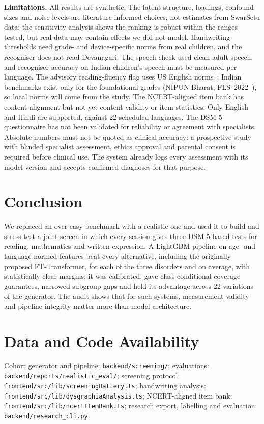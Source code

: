 \documentclass[conference]{IEEEtran}
\begin{document}
\textbf{Limitations.} All results are synthetic. The latent structure, loadings, confound sizes and noise levels are literature-informed choices, not estimates from SwarSetu data; the sensitivity analysis shows the ranking is robust within the ranges tested, but real data may contain effects we did not model. Handwriting thresholds need grade- and device-specific norms from real children, and the recogniser does not read Devanagari. The speech check used clean adult speech, and recogniser accuracy on Indian children's speech must be measured per language. The advisory reading-fluency flag uses US English norms~\cite{hasbrouck2017}; Indian benchmarks exist only for the foundational grades (NIPUN Bharat, FLS~2022~\cite{fls2022}), so local norms will come from the study. The NCERT-aligned item bank has content alignment but not yet content validity or item statistics. Only English and Hindi are supported, against 22 scheduled languages. The DSM-5 questionnaire has not been validated for reliability or agreement with specialists. Absolute numbers must not be quoted as clinical accuracy: a prospective study with blinded specialist assessment, ethics approval and parental consent is required before clinical use. The system already logs every assessment with its model version and accepts confirmed diagnoses for that purpose.

\section{Conclusion}
We replaced an over-easy benchmark with a realistic one and used it to build and stress-test a joint screen in which every session gives three DSM-5-based tests for reading, mathematics and written expression. A LightGBM pipeline on age- and language-normed features beat every alternative, including the originally proposed FT-Transformer, for each of the three disorders and on average, with statistically clear margins; it was calibrated, gave class-conditional coverage guarantees, narrowed subgroup gaps and held its advantage across 22 variations of the generator. The audit shows that for such systems, measurement validity and pipeline integrity matter more than model architecture.

\section*{Data and Code Availability}
Cohort generator and pipeline: \texttt{backend/screening/}; evaluations: \texttt{backend/reports/realistic\_eval/}; screening protocol: \texttt{frontend/src/lib/screeningBattery.ts}; handwriting analysis: \texttt{frontend/src/lib/dysgraphiaAnalysis.ts}; NCERT-aligned item bank: \texttt{frontend/src/lib/ncertItemBank.ts}; research export, labelling and evaluation: \texttt{backend/research\_cli.py}.
\end{document}
